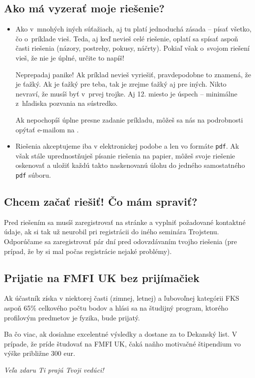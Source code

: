 \subsection{Ako má vyzerať moje riešenie?}
    \begin{itemize}
       \item Ako v~mnohých iných súťažiach, aj tu platí jednoduchá zásada -- písať všetko, čo
            o~príklade vieš. Teda, aj keď nevieš celé riešenie, oplatí sa spísať aspoň časti
            riešenia (názory, postrehy, pokusy, náčrty). Pokiaľ však o~svojom riešení vieš, že
            nie je úplné, určite to napíš!

            Neprepadaj panike! Ak príklad nevieš vyriešiť, pravdepodobne to znamená, že je
            ťažký. Ak je ťažký pre teba, tak je zrejme ťažký aj pre iných. Nikto nevraví,
            že musíš byť v~prvej trojke. Aj 12. miesto je úspech -- minimálne z~hľadiska
            pozvania na sústredko.

            Ak nepochopíš úplne presne zadanie príkladu, môžeš sa nás na podrobnosti opýtať
            e-mailom na .
        \item Riešenia akceptujeme iba v elektronickej podobe a len vo formáte \texttt{pdf}.
            Ak však stále uprednostňuješ písanie riešenia na papier,
            môžeš svoje riešenie oskenovať a uložiť každú takto naskenovanú úlohu
            do jedného samostatného \texttt{pdf} súboru.

    \end{itemize}

\subsection{Chcem začať riešiť! Čo mám spraviť?}
    Pred riešením sa musíš zaregistrovať na stránke 
    a vyplniť požadované kontaktné údaje, ak si tak už neurobil pri registrácii do iného seminára Trojstenu.
    Odporúčame sa zaregistrovať pár dní pred odovzdávaním tvojho riešenia
    (pre prípad, že by si mal počas registrácie nejaké problémy).

\subsection{Prijatie na FMFI UK bez prijímačiek}
    Ak účastník získa v niektorej časti (zimnej, letnej) a ľubovoľnej kategórii
    FKS aspoň 65\% celkového počtu bodov a hlási sa na študijný program,
    ktorého profilovým predmetov je fyzika, bude prijatý.

    Ba čo viac, ak dosiahne excelentné výsledky a dostane za to Dekanský list.
    V prípade, že príde študovať na FMFI UK, čaká naňho motivačné štipendium vo výške približne 300 eur.

\hfill \emph{Veľa zdaru Ti prajú Tvoji vedúci!}%

